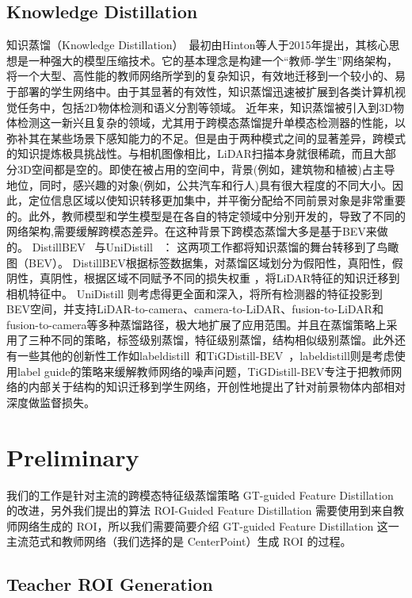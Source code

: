 \documentclass[12pt, UTF8]{ctexart}
\begin{document}
\subsection{Knowledge Distillation}
知识蒸馏（Knowledge Distillation）~\cite{hinton}最初由Hinton等人于2015年提出，其核心思想是一种强大的模型压缩技术。它的基本理念是构建一个“教师-学生”网络架构，将一个大型、高性能的教师网络所学到的复杂知识，有效地迁移到一个较小的、易于部署的学生网络中。由于其显著的有效性，知识蒸馏迅速被扩展到各类计算机视觉任务中，包括2D物体检测和语义分割等领域。
近年来，知识蒸馏被引入到3D物体检测这一新兴且复杂的领域，尤其用于跨模态蒸馏提升单模态检测器的性能，以弥补其在某些场景下感知能力的不足。但是由于两种模式之间的显著差异，跨模式的知识提炼极具挑战性。与相机图像相比，LiDAR扫描本身就很稀疏，而且大部分3D空间都是空的。即使在被占用的空间中，背景(例如，建筑物和植被)占主导地位，同时，感兴趣的对象(例如，公共汽车和行人)具有很大程度的不同大小。因此，定位信息区域以使知识转移更加集中，并平衡分配给不同前景对象是非常重要的。此外，教师模型和学生模型是在各自的特定领域中分别开发的，导致了不同的网络架构,需要缓解跨模态差异。在这种背景下跨模态蒸馏大多是基于BEV来做的。
DistillBEV~\cite{distillbev} 与UniDistill~\cite{unidistill} ： 这两项工作都将知识蒸馏的舞台转移到了鸟瞰图（BEV）。 DistillBEV根据标签数据集，对蒸馏区域划分为假阳性，真阳性，假阴性，真阴性，根据区域不同赋予不同的损失权重 ，将LiDAR特征的知识迁移到相机特征中。
UniDistill 则考虑得更全面和深入，将所有检测器的特征投影到BEV空间，并支持LiDAR-to-camera、camera-to-LiDAR、fusion-to-LiDAR和fusion-to-camera等多种蒸馏路径，极大地扩展了应用范围。并且在蒸馏策略上采用了三种不同的策略，标签级别蒸馏，特征级别蒸馏，结构相似级别蒸馏。此外还有一些其他的创新性工作如labeldistill~\cite{labeldistill}和TiGDistill-BEV~\cite{tigdistillbev}，labeldistill则是考虑使用label guide的策略来缓解教师网络的噪声问题，TiGDistill-BEV专注于把教师网络的内部关于结构的知识迁移到学生网络，开创性地提出了针对前景物体内部相对深度做监督损失。
\section{Preliminary}
我们的工作是针对主流的跨模态特征级蒸馏策略 GT-guided Feature Distillation 的改进，另外我们提出的算法 ROI-Guided Feature Distillation 需要使用到来自教师网络生成的 ROI，所以我们需要简要介绍 GT-guided Feature Distillation 这一主流范式和教师网络（我们选择的是 CenterPoint）生成 ROI 的过程。




\subsection{Teacher ROI Generation}
\end{document}
